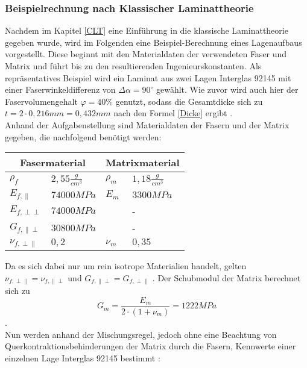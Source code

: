 \subsubsection{Beispielrechnung nach Klassischer Laminattheorie}
Nachdem im Kapitel \ref{CLT} eine Einführung in die klassische Laminattheorie gegeben wurde, wird im Folgenden eine Beispiel-Berechnung eines Lagenaufbaus vorgestellt. Diese beginnt mit den Materialdaten der verwendeten Faser und Matrix und führt bis zu den resultierenden Ingenieurskonstanten. Als repräsentatives Beispiel wird ein Laminat aus zwei Lagen Interglas 92145 mit einer Faserwinkeldifferenz von $\Delta\alpha =90^{\circ}$ gewählt. Wie zuvor wird auch hier der Faservolumengehalt $\varphi = 40\%$ genutzt, sodass die Gesamtdicke sich zu $t= 2\cdot 0,216mm=0,432mm$ nach den Formel \ref{Dicke} ergibt \cite{item5}\cite{item3}. \\

\noindent Anhand der Aufgabenstellung sind Materialdaten der Fasern und der Matrix gegeben, die nachfolgend benötigt werden:\\

\begin{tabular}{ll|ll}
	\multicolumn{2}{c}{Fasermaterial} &\multicolumn{2}{c}{Matrixmaterial}\\
	\hline\hline
	$\rho_{f}$ & $2,55 \frac{g}{cm^{3}}$  & $\rho_{m}$ & $1,18 \frac{g}{cm^{3}}$\\
	\hline
	$E_{f,\parallel}$ & $74000MPa$  & $E_{m}$ & $3300MPa$\\
	\hline
	$E_{f,\perp\perp}$ & $74000MPa$  &  & - \\
	\hline
	$G_{f,\parallel\perp}$ & $30800MPa$ &  & - \\
	\hline
	$\nu_{f,\perp\parallel}$ & $0,2$  &$\nu_{m}$ &  $0,35$\\
\end{tabular}

\noindent Da es sich dabei nur um rein isotrope Materialien handelt, gelten $\nu_{f,\perp\parallel} = \nu_{f,\parallel\perp}$ und $G_{f,\parallel\perp} = G_{f,\perp\parallel}$ \cite{item15}. Der Schubmodul der Matrix berechnet sich zu
\begin{equation}
 	G_{m}=\frac{E_{m}}{2\cdot (1+\nu_{m})}=1222MPa
\end{equation}.\\

\noindent Nun werden anhand der Mischungsregel, jedoch ohne eine Beachtung von Querkontraktionsbehinderungen der Matrix durch die Fasern, Kennwerte einer einzelnen Lage Interglas 92145 bestimmt \cite{item3}:

